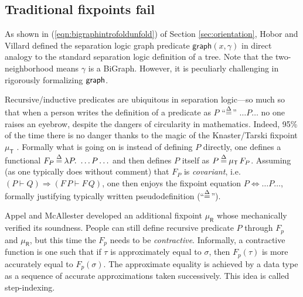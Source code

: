 \subsection{Traditional fixpoints fail}\label{sec:fixpointfail}

As shown in (\ref{eqn:bigraphintrofoldunfold}) of Section
\ref{sec:orientation}, Hobor and Villard\cite{hobor:ramification}
defined the separation logic graph predicate
$\mathsf{graph}(x,\gamma)$ in direct analogy to the standard
separation logic definition of a tree. Note that the two-neighborhood
means $\gamma$ is a BiGraph. However, it is peculiarly challenging in
rigorously formalizing $\mathsf{graph}$.


Recursive/inductive predicates are ubiquitous in separation logic---so
much so that when a person writes the definition of a predicate as $P$
``$\mathbin{\stackrel{\Delta}{=}}$'' $\ldots P \ldots$ no one raises an eyebrow, despite the
dangers of circularity in mathematics. Indeed, 95\% of the time there
is no danger thanks to the magic of the Knaster/Tarski fixpoint
$\mu_{\mathsf{T}}$ \cite{tarski:fixpoint}. Formally what is going on
is instead of defining $P$ directly, one defines a functional $F_P
\mathbin{\stackrel{\Delta}{=}} \lambda P.~ \ldots P \ldots$ and then defines $P$ itself as $P
\mathbin{\stackrel{\Delta}{=}} \mu_{\mathsf{T}} \, F_P$.  Assuming (as one typically does
without comment) that $F_P$ is \emph{covariant}, i.e. $(P \vdash Q)
\Rightarrow (F \, P \vdash F \, Q)$, one then enjoys the fixpoint
equation $P \Leftrightarrow \ldots P \ldots$, formally justifying
typically written pseudodefinition (``$\mathbin{\stackrel{\Delta}{=}}$'').

Appel and McAllester developed an additional fixpoint
$\mu_{\mathsf{R}}$ \cite{appel:fixpoint} whose \cite{appel:vmm}
mechanically verified its soundness. People can still define recursive
predicate $P$ through $F_p$ and $\mu_{\mathsf{R}}$, but this time the
$F_p$ needs to be \emph{contractive}. Informally, a contractive
function is one such that if $\tau$ is approximately equal to
$\sigma$, then $F_p(\tau)$ is more accurately equal to
$F_p(\sigma)$. The approximate equality is achieved by a data type as
a sequence of accurate approximations taken successively. This idea is
called step-indexing.

